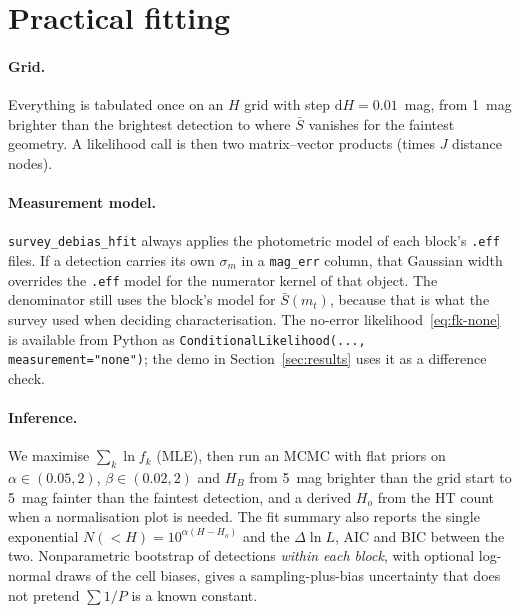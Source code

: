 \documentclass[11pt,a4paper]{article}
\begin{document}
\section{Practical fitting}
\label{sec:practice}

\paragraph{Grid.}
Everything is tabulated once on an $H$ grid with step $\mathrm{d}H=0.01$~mag,
from 1~mag brighter than the brightest detection to where $\bar S$ vanishes
for the faintest geometry.  A likelihood call is then two matrix--vector
products (times $J$ distance nodes).

\paragraph{Measurement model.}
\texttt{survey\_debias\_hfit} always applies the photometric model of each
block's \texttt{.eff} files.  If a detection carries its own $\sigma_m$ in a
\texttt{mag\_err} column, that Gaussian width overrides the \texttt{.eff}
model for the numerator kernel of that object.  The denominator still uses
the block's model for $\bar S(m_t)$, because that is what the survey used when
deciding characterisation.  The no-error likelihood~\eqref{eq:fk-none} is
available from Python as \texttt{ConditionalLikelihood(..., measurement="none")};
the demo in Section~\ref{sec:results} uses it as a difference check.

\paragraph{Inference.}
We maximise $\sum_k \ln f_k$ (MLE), then run an MCMC with flat priors on
$\alpha\in(0.05,2)$, $\beta\in(0.02,2)$ and $H_B$ from 5~mag brighter than
the grid start to 5~mag fainter than the faintest detection, and a derived
$H_o$ from the HT count when a normalisation plot is needed.  The fit summary
also reports the single exponential $N(<H)=10^{\alpha(H-H_o)}$ and the
$\Delta\ln L$, AIC and BIC between the two.  Nonparametric bootstrap of
detections \emph{within each block}, with optional log-normal draws of the
cell biases, gives a sampling-plus-bias uncertainty that does not pretend
$\sum 1/P$ is a known constant.
\end{document}
